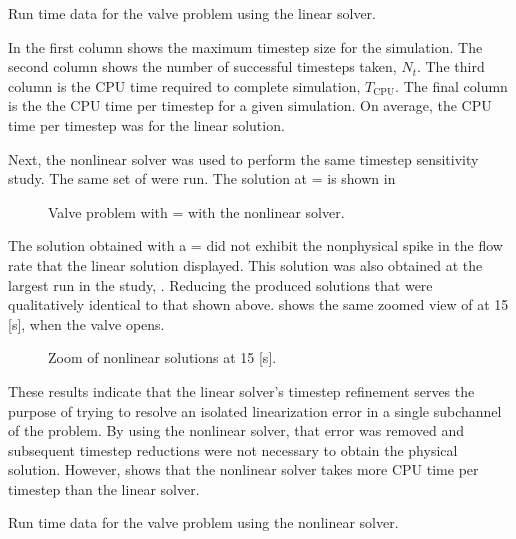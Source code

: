 \begin{table}[h!tb]
\centering
\singlespace

\caption{Run time data for the valve problem using the linear solver.}
\label{tab:valveLinTable}
\end{table}

In  the first column shows the maximum timestep size for the simulation.
The second column shows the number of successful timesteps taken, $N_{t}$.
The third column is the CPU time required to complete simulation, $T_{\text{CPU}}$.
The final column is the the CPU time per timestep for a given simulation.
On average, the CPU time per timestep was  for the linear solution.

Next, the nonlinear solver was used to perform the same timestep sensitivity study.
The same set of \dtmax{} were run.
The solution at \dtmax{} =  is shown in 

\begin{figure}[h!tb]
\centering

\caption{Valve problem with \dtmax{} =  with the nonlinear solver.}
\label{fig:valveNln6pt25em02}
\end{figure}

The solution obtained with a \dtmax{} =  did not exhibit the nonphysical spike in the flow rate that the linear solution displayed.
This solution was also obtained at the largest \dt{} run in the study, .
Reducing the \dtmax{} produced solutions that were qualitatively identical to that shown above.
 shows the same zoomed view of at 15 [s], when the valve opens.

\begin{figure}[h!tb]
\centering

\caption{Zoom of nonlinear solutions at 15 [s].}
\label{fig:valveNlnSols}
\end{figure}

These results indicate that the linear solver's timestep refinement serves the purpose of trying to resolve an isolated linearization error in a single subchannel of the problem.
By using the nonlinear solver, that error was removed and subsequent timestep reductions were not necessary to obtain the physical solution.
However,  shows that the nonlinear solver takes more CPU time per timestep than the linear solver.

\begin{table}[h!tb]
\centering
\singlespace

\caption{Run time data for the valve problem using the nonlinear solver.}
\label{tab:valveNlnTable}
\end{table}

